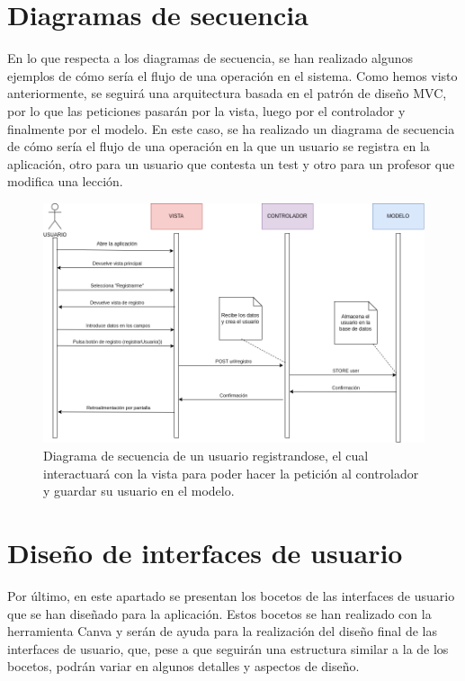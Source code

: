 \section{Diagramas de secuencia}
En lo que respecta a los diagramas de secuencia, se han realizado algunos ejemplos de cómo sería el flujo de una operación en el sistema. Como hemos visto anteriormente,
se seguirá una arquitectura basada en el patrón de diseño MVC, por lo que las peticiones pasarán por la vista, luego por el controlador y finalmente por el modelo.
En este caso, se ha realizado un diagrama de secuencia de cómo sería el flujo de una operación en la que un usuario se registra en la aplicación, otro para un usuario que contesta un test y otro
para un profesor que modifica una lección.

\begin{figure}[H]
    \centering
    \centerline{\includegraphics[width=\textwidth]{imagenes/c6/diagramadesecuencia.png}}
    \caption{Diagrama de secuencia de un usuario registrandose, el cual interactuará con la vista para poder hacer la petición al controlador y guardar su usuario en el modelo.}
    \label{fig:diagramadesecuencia}    
\end{figure}


\section{Diseño de interfaces de usuario}
Por último, en este apartado se presentan los bocetos de las interfaces de usuario que se han diseñado para la aplicación. Estos bocetos se han realizado con la herramienta Canva y serán de ayuda para la realización del diseño final de las interfaces de usuario,
que, pese a que seguirán una estructura similar a la de los bocetos, podrán variar en algunos detalles y aspectos de diseño.

